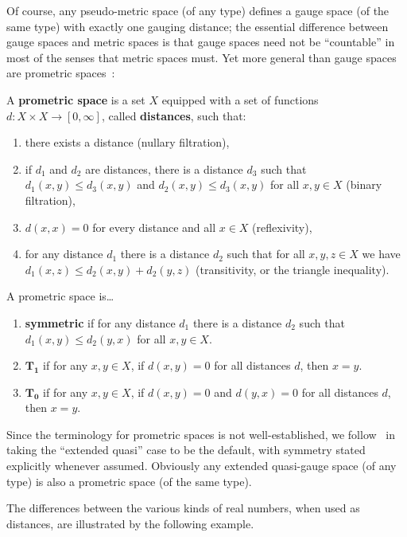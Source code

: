 \documentclass{article}
\def\Rp{[0,\infty]}
\begin{document}
Of course, any pseudo-metric space (of any type) defines a gauge space (of the same type) with exactly one gauging distance; the essential difference between gauge spaces and metric spaces is that gauge spaces need not be ``countable'' in most of the senses that metric spaces must.
Yet more general than gauge spaces are prometric spaces~\cite{cht:one-setting}:

\begin{defn}
  A \textbf{prometric space} is a set $X$ equipped with a set of functions $d:X\times X\to\Rp$, called \textbf{distances}, such that:
  \begin{enumerate}
  \item there exists a distance (nullary filtration),
  \item if $d_1$ and $d_2$ are distances, there is a distance $d_3$ such that $d_1(x,y)\le d_3(x,y)$ and $d_2(x,y)\le d_3(x,y)$ for all $x,y\in X$ (binary filtration),
  \item $d(x,x)=0$ for every distance and all $x\in X$ (reflexivity),
  \item for any distance $d_1$ there is a distance $d_2$ such that for all $x,y,z\in X$ we have $d_1(x,z)\le d_2(x,y)+d_2(y,z)$ (transitivity, or the triangle inequality).
  \end{enumerate}
  A prometric space is\dots
  \begin{enumerate}[resume]
  \item \textbf{symmetric} if for any distance $d_1$ there is a distance $d_2$ such that $d_1(x,y)\le d_2(y,x)$ for all $x,y\in X$.
  \item $\mathbf{T_1}$ if for any $x,y\in X$, if $d(x,y)=0$ for all distances $d$, then $x=y$.
  \item $\mathbf{T_0}$ if for any $x,y\in X$, if $d(x,y)=0$ and $d(y,x)=0$ for all distances $d$, then $x=y$.
  \end{enumerate}
\end{defn}

Since the terminology for prometric spaces is not well-established, we follow~\cite{cht:one-setting} in taking the ``extended quasi'' case to be the default, with symmetry stated explicitly whenever assumed.
Obviously any extended quasi-gauge space (of any type) is also a prometric space (of the same type).

The differences between the various kinds of real numbers, when used as distances, are illustrated by the following example.
\end{document}
